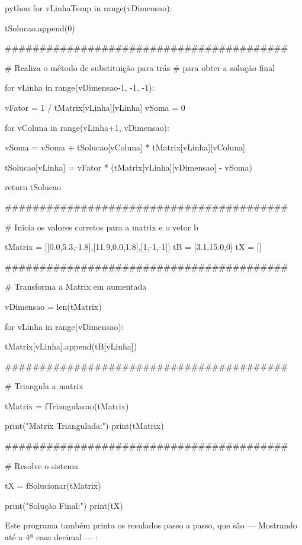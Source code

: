 \documentclass[twoside]{amsart}
\numberwithin{equation}{section}
\begin{document}
\begin{mintedbox}{python}
    for vLinhaTemp in range(vDimensao):

        tSolucao.append(0)

    #########################################

    # Realiza o método de substituição para trás
    # para obter a solução final

    for vLinha in range(vDimensao-1, -1, -1):

        vFator = 1 / tMatrix[vLinha][vLinha]
        vSoma = 0

        for vColuna in range(vLinha+1, vDimensao):

            vSoma = vSoma + tSolucao[vColuna] * tMatrix[vLinha][vColuna]

        tSolucao[vLinha] = vFator * (tMatrix[vLinha][vDimensao] - vSoma)

    return tSolucao

    #########################################

    # Inicia os valores corretos para a matrix e o vetor b

tMatrix = [[0.0,5.3,-1.8],[11.9,0.0,1.8],[1,-1,-1]]
tB = [3.1,15.0,0]
tX = []

    #########################################

    # Transforma a Matrix em aumentada

vDimensao = len(tMatrix)

for vLinha in range(vDimensao):

    tMatrix[vLinha].append(tB[vLinha])

    #########################################

    # Triangula a matrix

tMatrix = fTriangulacao(tMatrix)

print("Matrix Triangulada:")
print(tMatrix)

    #########################################

    # Resolve o sistema

tX = fSolucionar(tMatrix)

print("Solução Final:")
print(tX)
\end{mintedbox}

Este programa também printa os resulados passo a passo, que são --- Mostrando até a 4ª casa decimal --- :
\end{document}
